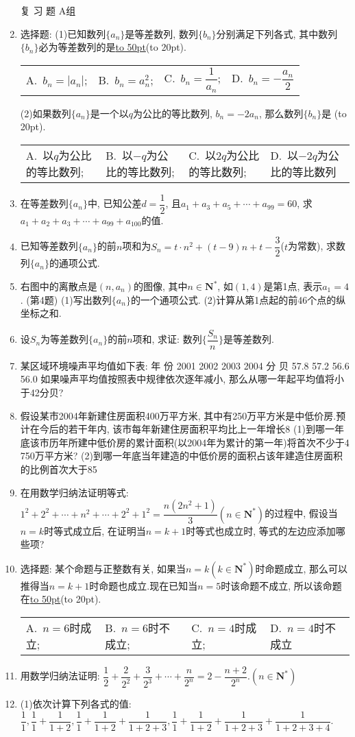 \documentclass[10pt,a4paper]{article}
\newcommand{\blank}[1]{\underline{\hbox to #1pt{}}}
\newcommand{\bracket}[1]{(\hbox to #1pt{})}
\newcommand{\fourch}[4]{\par\begin{tabular}{p{.23\textwidth}p{.23\textwidth}p{.23\textwidth}p{.23\textwidth}}
A.~#1 &B.~#2& C.~#3& D.~#4
\end{tabular}}
\begin{document}
\begin{enumerate}[1.]
复 习 题
A组
\item 选择题:
(1)已知数列$\{a_n\}$是等差数列, 数列$\{b_n\}$分别满足下列各式, 其中数列$\{b_n\}$必为等差数列的是\blank{50}\bracket{20}.
\fourch{$b_n=|a_n|$;}{$b_n=a_n^2$;}{$b_n=\dfrac 1{a_n}$;}{$b_n=-\dfrac{a_n}2$}
(2)如果数列$\{a_n\}$是一个以$q$为公比的等比数列, $b_n=-2a_n$, 那么数列$\{b_n\}$是  \bracket{20}.
\fourch{以$q$为公比的等比数列;}{以$-q$为公比的等比数列;}{以$2q$为公比的等比数列;}{以$-2q$为公比的等比数列}
\item 在等差数列$\{a_n\}$中, 已知公差$d=\dfrac 12$, 且$a_1+a_3+a_5+\cdots +a_{99}=60$, 求$a_1+a_2+a_3+\cdots +a_{99}+a_{100}$的值.
\item 已知等差数列$\{a_n\}$的前$n$项和为$S_n=t\cdot n^2+(t-9)n+t-\dfrac 32$($t$为常数), 求数列$\{a_n\}$的通项公式.
\item 右图中的离散点是$(n,a_n)$的图像, 其中$n\in \mathbf{N}^*$, 如$(1,4)$是第1点, 表示$a_1=4$.
(第4题)
(1)写出数列$\{a_n\}$的一个通项公式.
(2)计算从第1点起的前46个点的纵坐标之和.
\item 设$S_n$为等差数列$\{a_n\}$的前$n$项和, 求证: 数列$\{\dfrac{S_n}n\}$是等差数列.
\item 某区域环境噪声平均值如下表:
年  份	2001	2002	2003	2004
分  贝	57.8	57.2	56.6	56.0
如果噪声平均值按照表中规律依次逐年减小, 那么从哪一年起平均值将小于42分贝?
\item 假设某市2004年新建住房面积400万平方米, 其中有250万平方米是中低价房.预计在今后的若干年内, 该市每年新建住房面积平均比上一年增长8%
(1)到哪一年底该市历年所建中低价房的累计面积(以2004年为累计的第一年)将首次不少于4 750万平方米?
(2)到哪一年底当年建造的中低价房的面积占该年建造住房面积的比例首次大于85%
\item 在用数学归纳法证明等式: $1^2+2^2+\cdots +n^2+\cdots +2^2+1^2=\dfrac{n(2n^2+1)}3(n\in \mathbf{N}^*)$的过程中, 假设当$n=k$时等式成立后, 在证明当$n=k+1$时等式也成立时, 等式的左边应添加哪些项?
\item 选择题:
某个命题与正整数有关, 如果当$n=k(k\in \mathbf{N}^*)$时命题成立, 那么可以推得当$n=k+1$时命题也成立.现在已知当$n=5$时该命题不成立, 所以该命题在\blank{50}\bracket{20}.
\fourch{$n=6$时成立;}{$n=6$时不成立;}{$n=4$时成立;}{$n=4$时不成立}
\item 用数学归纳法证明: $\dfrac 12+\dfrac 2{2^2}+\dfrac 3{2^3}+\cdots +\dfrac n{2^n}=2-\dfrac{n+2}{2^n}$.$(n\in \mathbf{N}^*)$
\item (1)依次计算下列各式的值:
$\dfrac 11,\dfrac 11+\dfrac 1{1+2},\dfrac 11+\dfrac 1{1+2}+\dfrac 1{1+2+3},\dfrac 11+\dfrac 1{1+2}+\dfrac 1{1+2+3}+\dfrac 1{1+2+3+4}$.

\end{enumerate}
\end{document}

